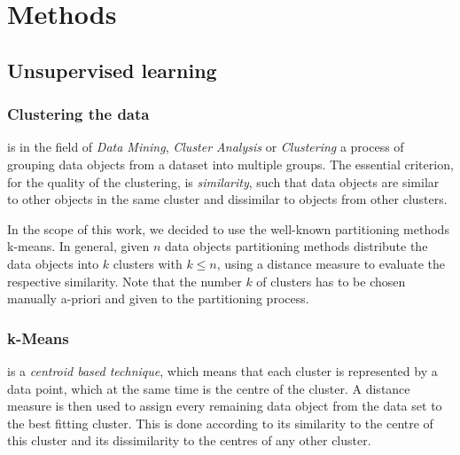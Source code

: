 \section{Methods}
	
	
	
	\subsection{Unsupervised learning}
	\subsubsection{Clustering the data}
	
	is in the field of \textit{Data Mining}, \textit{Cluster Analysis} or \textit{Clustering} a process of grouping data objects from a dataset into multiple groups. The essential criterion, for the quality of the clustering, is \textit{similarity}, such that data objects are similar to other objects in the same cluster and dissimilar to objects from other clusters. 
	
	In the scope of this work, we decided to use the well-known partitioning methods k-means. In general, given $n$ data objects partitioning methods distribute the data objects into $k$ clusters with $k\le n$, using a distance measure to evaluate the respective similarity. 
	Note that the number $k$ of clusters has to be chosen manually a-priori and given to the partitioning process.
	
	\subsubsection{k-Means}
	
	is a \textit{centroid based technique}, which means that each cluster is represented by a data point, which at the same time is the centre of the cluster. A distance measure is then used to assign every remaining data object from the data set to the best fitting cluster. This is done according to its similarity to the centre of this cluster and its dissimilarity to the centres of any other cluster.
	
